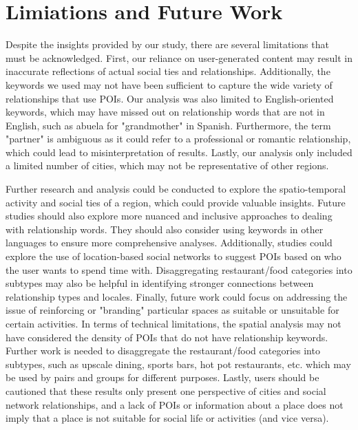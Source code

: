 \section{Limiations and Future Work}

Despite the insights provided by our study, there are several limitations that must be acknowledged. First, our reliance on user-generated content may result in inaccurate reflections of actual social ties and relationships. Additionally, the keywords we used may not have been sufficient to capture the wide variety of relationships that use POIs. Our analysis was also limited to English-oriented keywords, which may have missed out on relationship words that are not in English, such as abuela for "grandmother" in Spanish. Furthermore, the term "partner" is ambiguous as it could refer to a professional or romantic relationship, which could lead to misinterpretation of results. Lastly, our analysis only included a limited number of cities, which may not be representative of other regions.

Further research and analysis could be conducted to explore the spatio-temporal activity and social ties of a region, which could provide valuable insights. Future studies should also explore more nuanced and inclusive approaches to dealing with relationship words. They should also consider using keywords in other languages to ensure more comprehensive analyses. Additionally, studies could explore the use of location-based social networks to suggest POIs based on who the user wants to spend time with. Disaggregating restaurant/food categories into subtypes may also be helpful in identifying stronger connections between relationship types and locales. Finally, future work could focus on addressing the issue of reinforcing or "branding" particular spaces as suitable or unsuitable for certain activities. In terms of technical limitations, the spatial analysis may not have considered the density of POIs that do not have relationship keywords. Further work is needed to disaggregate the restaurant/food categories into subtypes, such as upscale dining, sports bars, hot pot restaurants, etc. which may be used by pairs and groups for different purposes. Lastly, users should be cautioned that these results only present one perspective of cities and social network relationships, and a lack of POIs or information about a place does not imply that a place is not suitable for social life or activities (and vice versa).

\vspace{12pt}


